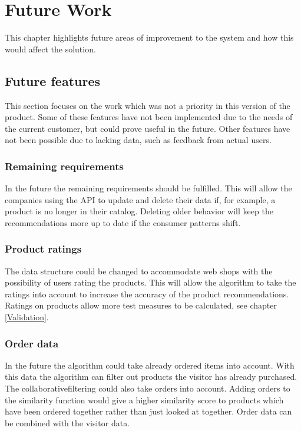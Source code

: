 
\chapter{Future Work} %

\label{FutureWork} %

This chapter highlights future areas of improvement to the system and how this would affect the solution.

\section{Future features}
This section focuses on the work which was not a priority in this version of the product. Some of these features have not been implemented due to the needs of the current customer, but could prove useful in the future. Other features have not been possible due to lacking data, such as feedback from actual users.

\subsection{Remaining requirements}
In the future the remaining requirements should be fulfilled. This will allow the companies using the \gls{API} to update and delete their data if, for example, a  product is no longer in their catalog. Deleting older behavior will keep the recommendations more up to date if the consumer patterns shift.

\subsection{Product ratings}
The data structure could be changed to accommodate web shops with the possibility of users rating the products. This will allow the algorithm to take the ratings into account to increase the accuracy of the product recommendations. Ratings on products allow more test measures to be calculated, see chapter \ref{Validation}.

\subsection{Order data}
In the future the algorithm could take already ordered items into account. With this data the algorithm can filter out products the visitor has already purchased. The \gls{collaborativefiltering} could also take orders into account. Adding orders to the similarity function would give a higher similarity score to products which have been ordered together rather than just looked at together. Order data can be combined with the visitor data.


